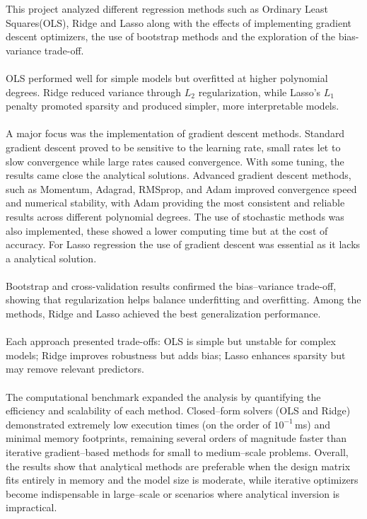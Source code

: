 \documentclass[
 reprint,            %
 amsmath,amssymb,
 aps,
]{revtex4-2}
\begin{document}
\label{sec:Discussion_and_Conclusion}
This project analyzed different regression methods such as Ordinary Least Squares(OLS),
Ridge and Lasso along with the effects of implementing gradient descent optimizers,
the use of bootstrap methods and the exploration of the bias-variance trade-off.\\\\
OLS performed well for simple models but overfitted at higher polynomial degrees.
Ridge reduced variance through $L_2$ regularization, while Lasso’s $L_1$ penalty promoted sparsity and produced simpler, more interpretable models.\\\\
A major focus was the implementation of gradient descent methods.
Standard gradient descent proved to be sensitive to the learning rate, small rates let to slow convergence while large rates caused convergence.
With some tuning, the results came close the analytical solutions.
Advanced gradient descent methods, such as Momentum, Adagrad, RMSprop, and Adam improved convergence speed and numerical stability, with Adam providing the most consistent and reliable results across different polynomial degrees. 
The use of stochastic methods was also implemented, these showed a lower computing time but at the cost of accuracy.
For Lasso regression the use of gradient descent was essential as it lacks a analytical solution.\\\\
Bootstrap and cross-validation results confirmed the bias–variance trade-off, showing that regularization helps balance underfitting and overfitting.
Among the methods, Ridge and Lasso achieved the best generalization performance.\\\\
Each approach presented trade-offs:
OLS is simple but unstable for complex models;
Ridge improves robustness but adds bias;
Lasso enhances sparsity but may remove relevant predictors.\\\\
The computational benchmark expanded the analysis by quantifying the efficiency and scalability of each method.  
Closed–form solvers (OLS and Ridge) demonstrated extremely low execution times (on the order of $10^{-1}$\,ms) and minimal memory footprints, remaining several orders of magnitude faster than iterative gradient–based methods for small to medium–scale problems.   
Overall, the results show that analytical methods are preferable when the design matrix fits entirely in memory and the model size is moderate, while iterative optimizers become indispensable in large–scale or scenarios where analytical inversion is impractical.  
\end{document}
